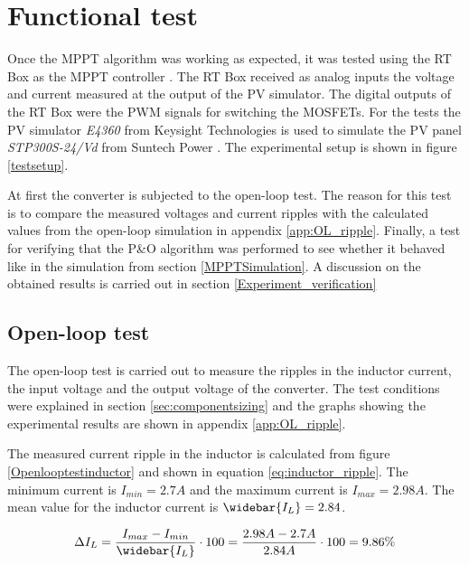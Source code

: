 \section{Functional test} \label{systemtest}
Once the MPPT algorithm was working as expected, it was tested using the RT Box as the MPPT controller \cite{RTbox}. The RT Box received as analog inputs the voltage and current measured at the output of the PV simulator. The digital outputs of the RT Box were the PWM signals for switching the MOSFETs. For the tests the PV simulator \textit{E4360} from Keysight Technologies \cite{PV_simulator} is used to simulate the PV panel \textit{STP300S-24/Vd} from Suntech Power \cite{PV_panel}.  The experimental setup is shown in figure \ref{testsetup}.

At first the converter is subjected to the open-loop test. The reason for this test is to compare the measured voltages and current ripples with the calculated values from the open-loop simulation in appendix \ref{app:OL_ripple}. 
Finally, a test for verifying that the P\&O algorithm was performed to see whether it behaved like in the simulation from section \ref{MPPTSimulation}. A discussion on the obtained results is carried out in section \ref{Experiment_verification}


\subsection{Open-loop test}

The open-loop test is carried out to measure the ripples in the inductor current, the input voltage and the output voltage of the converter. The test conditions were explained in section \ref{sec:componentsizing} and the graphs showing the experimental results are shown in appendix \ref{app:OL_ripple}.

The measured current ripple in the inductor is calculated from figure \ref{Openlooptestinductor} and shown in equation \ref{eq:inductor_ripple}. The minimum current is $I_{min} = 2.7A$ and the maximum current is $I_{max} = 2.98A$. The mean value for the inductor current is $\widebar{I_L}= 2.84$. 

\begin{equation} \label{eq:inductor_rippleexpirment}
\Delta I_L = \frac{I_{max}-I_{min}}{\widebar{I_L}} \cdot 100 = \frac{2.98A-2.7A}{2.84A} \cdot 100 = 9.86\%
\end{equation}

